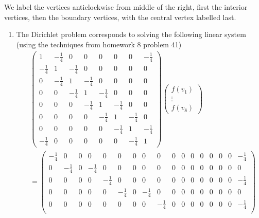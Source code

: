 \documentclass[12 pt, letterpaper]{hmcpset}
\begin{document}
\begin{landscape}
\begin{solution}
	We label the vertices anticlockwise from middle of the right, first the interior vertices, then the boundary vertices, with the central vertex labelled last.
	\begin{enumerate}
		\item The Dirichlet problem corresponds to solving the following linear system (using the techniques from homework 8 problem 41)
			\setcounter{MaxMatrixCols}{20}
			\begin{align*}
				& \begin{pmatrix}
   1 & -\frac{1}{4} &    0 &    0 &    0 &    0 &    0 & -\frac{1}{4} \\
-\frac{1}{4} &    1 & -\frac{1}{4} &    0 &    0 &    0 &    0 &    0 \\
   0 & -\frac{1}{4} &    1 & -\frac{1}{4} &    0 &    0 &    0 &    0 \\
   0 &    0 & -\frac{1}{4} &    1 & -\frac{1}{4} &    0 &    0 &    0 \\
   0 &    0 &    0 & -\frac{1}{4} &    1 & -\frac{1}{4} &    0 &    0 \\
   0 &    0 &    0 &    0 & -\frac{1}{4} &    1 & -\frac{1}{4} &    0 \\
   0 &    0 &    0 &    0 &    0 & -\frac{1}{4} &    1 & -\frac{1}{4} \\
-\frac{1}{4} &    0 &    0 &    0 &    0 &    0 & -\frac{1}{4} &    1
\end{pmatrix} \begin{pmatrix}
	f(v_{1}) \\
	\vdots \\
	f(v_{8})
\end{pmatrix} \\ & = \begin{pmatrix}
-\frac{1}{4} &    0 & 0 &    0 &    0 &    0 & 0 &    0 &    0 &    0 & 0 &    0 &    0 &    0 & 0 &    0 & -\frac{1}{4} \\
   0 & -\frac{1}{4} & 0 & -\frac{1}{4} &    0 &    0 & 0 &    0 &    0 &    0 & 0 &    0 &    0 &    0 & 0 &    0 &    0 \\
   0 &    0 & 0 &    0 & -\frac{1}{4} &    0 & 0 &    0 &    0 &    0 & 0 &    0 &    0 &    0 & 0 &    0 & -\frac{1}{4} \\
   0 &    0 & 0 &    0 &    0 & -\frac{1}{4} & 0 & -\frac{1}{4} &    0 &    0 & 0 &    0 &    0 &    0 & 0 &    0 &    0 \\
   0 &    0 & 0 &    0 &    0 &    0 & 0 &    0 & -\frac{1}{4} &    0 & 0 &    0 &    0 &    0 & 0 &    0 & -\frac{1}{4} \\

\end{pmatrix}
\end{align*}
\end{enumerate}
\end{solution}
\end{landscape}
\end{document}
